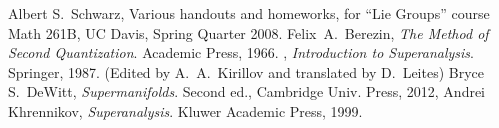 \begin{thebibliography}{99}
  Albert S.~Schwarz,
  Various handouts and homeworks, for ``Lie Groups'' course Math 261B,
  UC Davis, Spring Quarter 2008.
Felix~A.~Berezin,
\textit{The Method of Second Quantization}.
Academic Press, 1966.
\bysame, %
\textit{Introduction to Superanalysis}.
Springer, 1987.\newline
(Edited by A.~A.~Kirillov and translated by D.~Leites)
  Bryce S.~DeWitt,
  \textit{Supermanifolds}.
Second ed., Cambridge Univ. Press, 2012,
{\tt{}}
Andrei Khrennikov,
 \emph{Superanalysis}.
Kluwer Academic Press, 1999.
\end{thebibliography}
